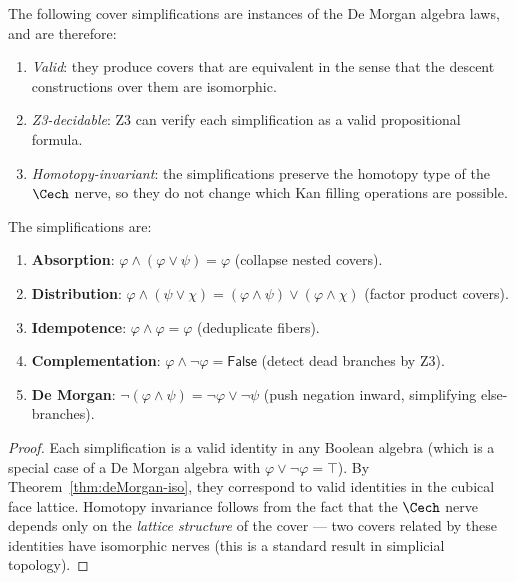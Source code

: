 \begin{corollary}
\label{cor:cover-simplification}
The following cover simplifications are instances of the De Morgan algebra
laws, and are therefore:
\begin{enumerate}
\item \emph{Valid}: they produce covers that are equivalent in the sense
  that the descent constructions over them are isomorphic.
\item \emph{Z3-decidable}: Z3 can verify each simplification as a valid
  propositional formula.
\item \emph{Homotopy-invariant}: the simplifications preserve the homotopy
  type of the $\Cech$ nerve, so they do not change which Kan filling operations
  are possible.
\end{enumerate}
The simplifications are:
\begin{enumerate}
\item \textbf{Absorption}: $\varphi \wedge (\varphi \vee \psi) = \varphi$
  \quad (collapse nested covers).
\item \textbf{Distribution}: $\varphi \wedge (\psi \vee \chi)
  = (\varphi \wedge \psi) \vee (\varphi \wedge \chi)$
  \quad (factor product covers).
\item \textbf{Idempotence}: $\varphi \wedge \varphi = \varphi$
  \quad (deduplicate fibers).
\item \textbf{Complementation}: $\varphi \wedge \neg\varphi = \mathsf{False}$
  \quad (detect dead branches by Z3).
\item \textbf{De Morgan}: $\neg(\varphi \wedge \psi) = \neg\varphi \vee
  \neg\psi$ \quad (push negation inward, simplifying else-branches).
\end{enumerate}
\end{corollary}

\begin{proof}
Each simplification is a valid identity in any Boolean algebra (which is a
special case of a De Morgan algebra with $\varphi \vee \neg\varphi = \top$).
By Theorem~\ref{thm:deMorgan-iso}, they correspond to valid identities in the
cubical face lattice.  Homotopy invariance follows from the fact that the $\Cech$
nerve depends only on the \emph{lattice structure} of the cover --- two covers
related by these identities have isomorphic nerves (this is a standard result
in simplicial topology).
\end{proof}

